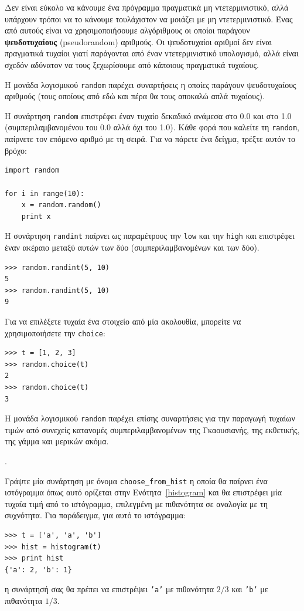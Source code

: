\documentclass[10pt]{book}
\begin{document}
Δεν είναι εύκολο να κάνουμε ένα πρόγραμμα πραγματικά μη ντετερμινιστικό, αλλά υπάρχουν τρόποι να το κάνουμε τουλάχιστον να μοιάζει με μη ντετερμινιστικό. Ένας από αυτούς είναι να χρησιμοποιήσουμε αλγόριθμους οι οποίοι παράγουν {\bf ψευδοτυχαίους} (pseudorandom) αριθμούς. Οι ψευδοτυχαίοι αριθμοί δεν είναι πραγματικά τυχαίοι γιατί παράγονται από έναν ντετερμινιστικό υπολογισμό, αλλά είναι σχεδόν αδύνατον να τους ξεχωρίσουμε από κάποιους πραγματικά τυχαίους.

Η μονάδα λογισμικού {\tt random} παρέχει συναρτήσεις η οποίες παράγουν ψευδοτυχαίους αριθμούς (τους οποίους από εδώ και πέρα θα τους αποκαλώ απλά τυχαίους).

Η συνάρτηση {\tt random} επιστρέφει έναν τυχαίο δεκαδικό ανάμεσα στο 0.0 και στο 1.0 (συμπεριλαμβανομένου του 0.0 αλλά όχι του 1.0). Κάθε φορά που καλείτε τη {\tt random}, παίρνετε τον επόμενο αριθμό με τη σειρά. Για να πάρετε ένα δείγμα, τρέξτε αυτόν το βρόχο:

\begin{verbatim}
import random

for i in range(10):
    x = random.random()
    print x
\end{verbatim}
%
Η συνάρτηση {\tt randint} παίρνει ως παραμέτρους την {\tt low} και την {\tt high} και επιστρέφει έναν ακέραιο μεταξύ αυτών των δύο (συμπεριλαμβανομένων και των δύο).

\begin{verbatim}
>>> random.randint(5, 10)
5
>>> random.randint(5, 10)
9
\end{verbatim}
%
Για να επιλέξετε τυχαία ένα στοιχείο από μία ακολουθία, μπορείτε να χρησιμοποιήσετε την {\tt choice}:

\begin{verbatim}
>>> t = [1, 2, 3]
>>> random.choice(t)
2
>>> random.choice(t)
3
\end{verbatim}
%
Η μονάδα λογισμικού {\tt random} παρέχει επίσης συναρτήσεις για την παραγωγή τυχαίων τιμών από συνεχείς κατανομές συμπεριλαμβανομένων της Γκαουσιανής, της εκθετικής, της γάμμα και μερικών ακόμα.
\\
\begin{exercise}.

Γράψτε μία συνάρτηση με όνομα \verb"choose_from_hist" η οποία θα παίρνει ένα ιστόγραμμα όπως αυτό ορίζεται στην Ενότητα~\ref{histogram} και θα επιστρέφει μία τυχαία τιμή από το ιστόγραμμα, επιλεγμένη με πιθανότητα σε αναλογία με τη συχνότητα. Για παράδειγμα, για αυτό το ιστόγραμμα:

\begin{verbatim}
>>> t = ['a', 'a', 'b']
>>> hist = histogram(t)
>>> print hist
{'a': 2, 'b': 1}
\end{verbatim}
%
η συνάρτησή σας θα πρέπει να επιστρέψει {\tt 'a'} με πιθανότητα $2/3$ και {\tt 'b'} με πιθανότητα $1/3$.
\end{exercise}
\end{document}
